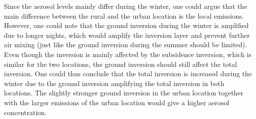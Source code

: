 Since the aerosol levels mainly differ during the winter, one could argue that the main difference between the rural and the urban location is the local emissions. However, one could note that the ground inversion during the winter is amplified due to longer nights, which would amplify the inversion layer and prevent further air mixing (just like the ground inversion during the summer should be limited). Even though the inversion is mainly affected by the subsidence inversion, which is similar for the two locations, the ground inversion should still affect the total inversion. One could thus conclude that the total inversion is increased during the winter due to the ground inversion amplifying the total inversion in both locations. The slightly stronger ground inversion in the urban location together with the larger emissions of the urban location would give a higher aerosol concentration.

